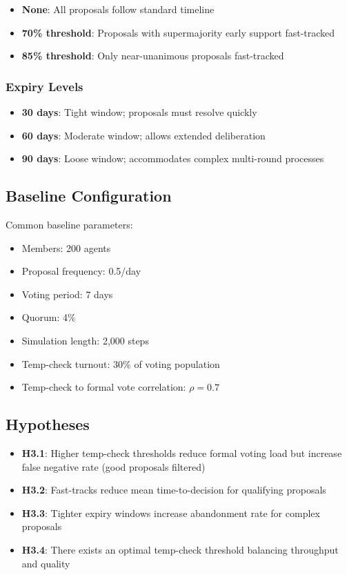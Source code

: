 \begin{itemize}
    \item \textbf{None}: All proposals follow standard timeline
    \item \textbf{70\% threshold}: Proposals with supermajority early support fast-tracked
    \item \textbf{85\% threshold}: Only near-unanimous proposals fast-tracked
\end{itemize}

\subsubsection{Expiry Levels}

\begin{itemize}
    \item \textbf{30 days}: Tight window; proposals must resolve quickly
    \item \textbf{60 days}: Moderate window; allows extended deliberation
    \item \textbf{90 days}: Loose window; accommodates complex multi-round processes
\end{itemize}

\subsection{Baseline Configuration}

Common baseline parameters:

\begin{itemize}
    \item Members: 200 agents
    \item Proposal frequency: 0.5/day
    \item Voting period: 7 days
    \item Quorum: 4\%
    \item Simulation length: 2,000 steps
    \item Temp-check turnout: 30\% of voting population
    \item Temp-check to formal vote correlation: $\rho = 0.7$
\end{itemize}

\subsection{Hypotheses}

\begin{itemize}
    \item \textbf{H3.1}: Higher temp-check thresholds reduce formal voting load but increase false negative rate (good proposals filtered)
    \item \textbf{H3.2}: Fast-tracks reduce mean time-to-decision for qualifying proposals
    \item \textbf{H3.3}: Tighter expiry windows increase abandonment rate for complex proposals
    \item \textbf{H3.4}: There exists an optimal temp-check threshold balancing throughput and quality
\end{itemize}

